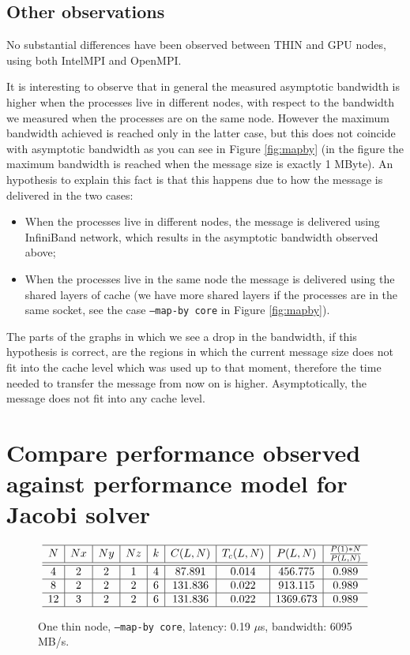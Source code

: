 \documentclass{article}
\begin{document}
\subsection{Other observations}

No substantial differences have been observed between THIN and GPU nodes, using both IntelMPI and OpenMPI.

It is interesting to observe that in general the measured asymptotic bandwidth is higher when the processes live in different nodes, with respect to the bandwidth we measured when the processes are on the same node. However the maximum bandwidth achieved is reached only in the latter case, but this does not coincide with asymptotic bandwidth as you can see in Figure \ref{fig:mapby} (in the figure the maximum bandwidth is reached when the message size is exactly 1 MByte). An hypothesis to explain this fact is that this happens due to how the message is delivered in the two cases:
\begin{itemize}
    \item When the processes live in different nodes, the message is delivered using InfiniBand network, which results in the asymptotic bandwidth observed above;
    \item When the processes live in the same node the message is delivered using the shared layers of cache (we have more shared layers if the processes are in the same socket, see the case \texttt{--map-by core} in Figure \ref{fig:mapby}).
\end{itemize}
The parts of the graphs in which we see a drop in the bandwidth, if this hypothesis is correct, are the regions in which the current message size does not fit into the cache level which was used up to that moment, therefore the time needed to transfer the message from now on is higher. Asymptotically, the message does not fit into any cache level.

\newpage
\section{Compare performance observed against performance model for Jacobi solver}

\begin{figure}[h!]
    $$
        \begin{array}{c | c | c | c | c | c | c | c | c} \hline
            N  & Nx & Ny & Nz & k & C(L,N)  & T_c(L,N) &     P(L,N)     & \frac{P(1)*N}{P(L,N)} \\ \hline
            \hline
            4  & 2  & 2  & 1  & 4 & 87.891  &  0.014   & 456.775  &         0.989         \\ \hline
            8  & 2  & 2  & 2  & 6 & 131.836 &  0.022   & 913.115  &         0.989         \\ \hline
            12 & 3  & 2  & 2  & 6 & 131.836 &  0.022   & 1369.673 &         0.989         \\ \hline
        \end{array}
    $$
    \caption{One thin node, \texttt{--map-by core}, latency: 0.19 $\mu$s, bandwidth: 6095 MB/s.}
\end{figure}
\end{document}
